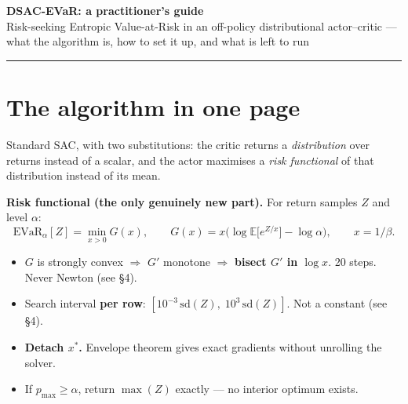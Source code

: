 \documentclass[10pt,a4paper]{article}
\newcommand{\evar}{\mathrm{EVaR}}
\begin{document}
\begin{center}
{\Large\textbf{DSAC-EVaR: a practitioner's guide}}\\[0.3em]
{\small\textcolor{soft}{Risk-seeking Entropic Value-at-Risk in an off-policy
distributional actor--critic --- what the algorithm is, how to set it up, and what
is left to run}}
\end{center}

\vspace{-0.3em}
\hrule
\vspace{0.6em}

\section{The algorithm in one page}

Standard SAC, with two substitutions: the critic returns a \emph{distribution} over
returns instead of a scalar, and the actor maximises a \emph{risk functional} of
that distribution instead of its mean.

\vspace{-0.2em}
\begin{tcolorbox}[colback=white,colframe=soft!30,boxrule=0.5pt,left=6pt,right=6pt,top=4pt,bottom=4pt]
\small
\textbf{Risk functional (the only genuinely new part).} For return samples $Z$ and
level $\alpha$:
\vspace{-0.4em}
\begin{equation*}
\evar_\alpha[Z] = \min_{x>0} G(x), \qquad
G(x) = x\Big(\log \mathbb{E}\big[e^{Z/x}\big] - \log\alpha\Big), \qquad x = 1/\beta .
\end{equation*}
\vspace{-1.0em}
\begin{itemize}[leftmargin=1.2em,itemsep=0.1em,topsep=0.2em]
\item $G$ is strongly convex $\Rightarrow$ $G'$ monotone $\Rightarrow$
      \textbf{bisect $G'$ in $\log x$}. 20 steps. Never Newton (see \S4).
\item Search interval \textbf{per row}: $[10^{-3}\,\mathrm{sd}(Z),\;
      10^{3}\,\mathrm{sd}(Z)]$. Not a constant (see \S4).
\item \textbf{Detach $x^\ast$.} Envelope theorem gives exact gradients without
      unrolling the solver.
\item If $p_{\max}\ge\alpha$, return $\max(Z)$ exactly --- no interior optimum exists.
\end{itemize}
\end{tcolorbox}
\end{document}
